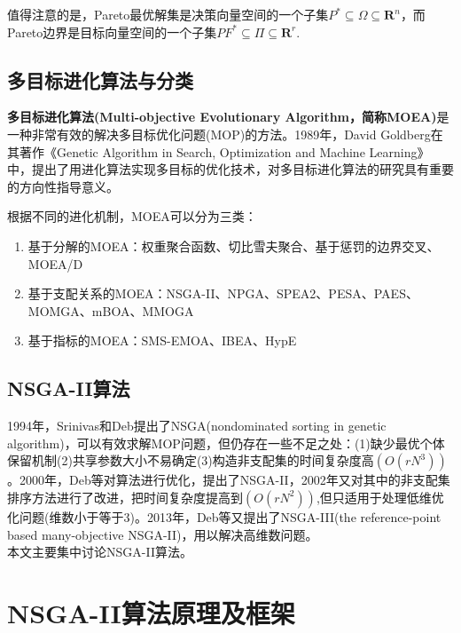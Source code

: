 \documentclass[lang=cn,a4paper,citestyle=gb7714-2015, bibstyle=gb7714-2015]{elegantpaper}
\newcommand{\R}{\mathbf{R}}
\begin{document}
    值得注意的是，Pareto最优解集是决策向量空间的一个子集$P^*\subseteq\Omega\subseteq\R^n$，而Pareto边界是目标向量空间的一个子集$PF^*\subseteq\varPi\subseteq\R^r$.


    \subsection{多目标进化算法与分类}
    \textbf{多目标进化算法(Multi-objective Evolutionary Algorithm，简称MOEA)}是一种非常有效的解决多目标优化问题(MOP)的方法。1989年，David Goldberg在其著作《Genetic Algorithm in Search, Optimization and Machine Learning\parencite{goldberg1989genetic}》中，提出了用进化算法实现多目标的优化技术，对多目标进化算法的研究具有重要的方向性指导意义。

    根据不同的进化机制，MOEA可以分为三类：
    \begin{enumerate}
        \item 基于分解的MOEA：权重聚合函数、切比雪夫聚合、基于惩罚的边界交叉、MOEA/D
        \item 基于支配关系的MOEA：NSGA-II、NPGA、SPEA2、PESA、PAES、MOMGA、mBOA、MMOGA
        \item 基于指标的MOEA：SMS-EMOA、IBEA、HypE
    \end{enumerate}

    \subsection{NSGA-II算法}
    1994年，Srinivas和Deb提出了NSGA(nondominated sorting in genetic algorithm)\parencite{NSGA}，可以有效求解MOP问题，但仍存在一些不足之处：(1)缺少最优个体保留机制(2)共享参数大小不易确定(3)构造非支配集的时间复杂度高$(O(rN^3))$。2000年，Deb等对算法进行优化，提出了NSGA-II\parencite{NSGA2prototype}，2002年又对其中的非支配集排序方法进行了改进\parencite{NSGA2}，把时间复杂度提高到$(O(rN^2))$,但只适用于处理低维优化问题(维数小于等于3)。2013年，Deb等又提出了NSGA-III(the reference-point based many-objective NSGA-II)，用以解决高维数问题。\\

    本文主要集中讨论NSGA-II算法。

    \section{NSGA-II算法原理及框架}
\end{document}
